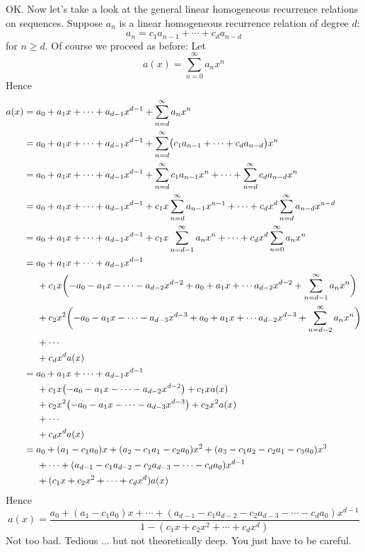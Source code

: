 OK. Now let's take a look at the general linear homogeneous 
recurrence relations on sequences.
Suppose $a_n$ is a linear homogeneous recurrence relation of degree $d$:
\[
a_n = c_1 a_{n-1} + \cdots + c_d a_{n-d}
\]
for $n \geq d $.
Of course we proceed as before:
Let 
\[
a(x) = \sum_{n=0}^\infty a_n x^n
\]
Hence
\begin{align*}
a(x) 
&= a_0 + a_1 x + \cdots + a_{d-1} x^{d-1} + \sum_{n=d}^\infty a_n x^n \\
&= a_0 + a_1 x + \cdots + a_{d-1} x^{d-1} 
+ \sum_{n=d}^\infty 
\bigl( 
c_1 a_{n-1} + \cdots + c_d a_{n-d}
\bigr) x^n \\
&=
 a_0 + a_1 x + \cdots + a_{d-1} x^{d-1}
 + \sum_{n=d}^\infty  c_1 a_{n-1}x^n  
+ \cdots 
+ \sum_{n=d}^\infty  c_d a_{n-d}x^n  \\
&=
 a_0 + a_1 x + \cdots + a_{d-1} x^{d-1}
 + c_1 x \sum_{n=d}^\infty  a_{n-1}x^{n-1}    
+ \cdots 
+ c_d x^d \sum_{n=d}^\infty  a_{n-d}x^{n-d}  \\
&=
 a_0 + a_1 x + \cdots + a_{d-1} x^{d-1}
+ c_1 x \sum_{n=d-1}^\infty  a_n x^n   
+ \cdots 
+ c_d x^d \sum_{n=0}^\infty  a_n x^n  \\
&= a_0 + a_1 x + \cdots + a_{d-1} x^{d-1} \\ 
&\hskip 0.5cm + c_1 x \biggl( -a_0 - a_1x - \cdots - a_{d-2}x^{d-2} + a_0 + a_1x + \cdots
a_{d-2}x^{d-2} + \sum_{n=d-1}^\infty  a_n x^n \biggr) \\
&\hskip 0.5cm + c_2 x^2 \biggl( -a_0 - a_1x - \cdots - a_{d-3}x^{d-3} + a_0 + a_1x + \cdots
a_{d-2}x^{d-3} + \sum_{n=d-2}^\infty  a_n x^n \biggr) \\
&\hskip 0.5cm + \cdots \\
&\hskip 0.5cm + c_d x^d a(x)  \\
%
&= a_0 + a_1 x + \cdots + a_{d-1} x^{d-1}  \\
&\hskip 0.5cm 
+ c_1 x \bigl( -a_0 - a_1x - \cdots - a_{d-2}x^{d-2} \bigr) + c_1x a(x)\\
&\hskip 0.5cm 
+ c_2 x^2 \bigl( -a_0 - a_1x - \cdots - a_{d-3}x^{d-3} \bigr) + c_2x^2a(x) \\
&\hskip 0.5cm + \cdots \\
&\hskip 0.5cm + c_d x^d a(x)  \\
%
&= 
a_0 + 
(a_1 - c_1a_0)x + 
(a_2 - c_1a_1 - c_2a_0) x^2 + 
(a_3 - c_1a_2 - c_2a_1 - c_3 a_0) x^3 \\ 
&\hskip 0.5cm + \cdots +
(a_{d-1} - c_1 a_{d-2} - c_2 a_{d-3} - \cdots - c_da_0)x^{d-1}  
\\
&\hskip 0.5cm + (c_1x + c_2x^2 + \cdots + c_d x^d) a(x)
\end{align*}
Hence
\[
a(x) = 
\frac
{
a_0 + (a_1 - c_1a_0)x + \cdots 
+ (a_{d-1} - c_1 a_{d-2} - c_2 a_{d-3} - \cdots - c_da_0)x^{d-1}  
}
{
1 - (c_1x + c_2x^2 + \cdots + c_d x^d)
}
\]
Not too bad.
Tedious ... but not theoretically deep.
You just have to be careful.

